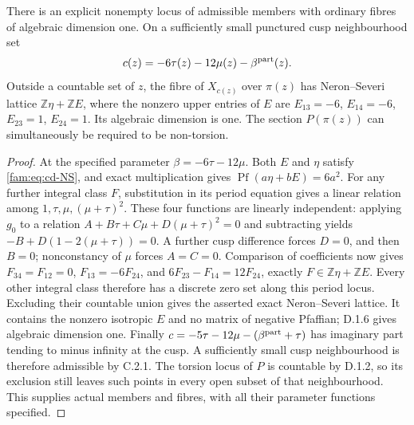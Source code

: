 \begin{proposition}\label{fam:src:D.1.7}\label{fam:st:D.1.7}
There is an explicit nonempty locus of admissible members with ordinary
fibres of algebraic dimension one. On a sufficiently small punctured
cusp neighbourhood set
\[
 c(z)=-6\tau(z)-12\mu(z)-\beta^{\rm part}(z).
\]
Outside a countable set of $z$, the fibre of $X_{c(z)}$ over $\pi(z)$ has
Neron--Severi lattice $\mathbb Z\eta+\mathbb ZE$, where the nonzero upper
entries of $E$ are
$E_{13}=-6$, $E_{14}=-6$, $E_{23}=1$, $E_{24}=1$.
Its algebraic dimension is one. The section $P(\pi(z))$ can simultaneously
be required to be non-torsion.
\end{proposition}
\begin{proof}
At the specified parameter $\beta=-6\tau-12\mu$. Both $E$ and $\eta$
satisfy \eqref{fam:eq:cd-NS}, and exact multiplication gives
$\operatorname{Pf}(a\eta+bE)=6a^2$.
For any further integral class $F$, substitution in its period equation
gives a linear relation among $1,\tau,\mu,(\mu+\tau)^2$.
These four functions are linearly independent: applying $g_0$ to a
relation $A+B\tau+C\mu+D(\mu+\tau)^2=0$ and subtracting yields
$-B+D(1-2(\mu+\tau))=0$. A further cusp difference forces $D=0$,
and then $B=0$; nonconstancy of $\mu$ forces $A=C=0$.
Comparison of coefficients now gives
$F_{34}=F_{12}=0$, $F_{13}=-6F_{24}$, and
$6F_{23}-F_{14}=12F_{24}$, exactly
$F\in\mathbb Z\eta+\mathbb ZE$. Every other integral class therefore
has a discrete zero set along this period locus. Excluding their
countable union gives the asserted exact Neron--Severi lattice.
It contains the nonzero isotropic $E$ and no matrix of negative
Pfaffian; D.1.6 gives algebraic dimension one.
Finally
$c=-5\tau-12\mu-(\beta^{\rm part}+\tau)$ has imaginary part tending
to minus infinity at the cusp. A sufficiently small cusp neighbourhood
is therefore admissible by C.2.1. The torsion locus of $P$ is countable
by D.1.2, so its exclusion still leaves such points in every open subset
of that neighbourhood. This supplies actual members and fibres, with
all their parameter functions specified.
\end{proof}

